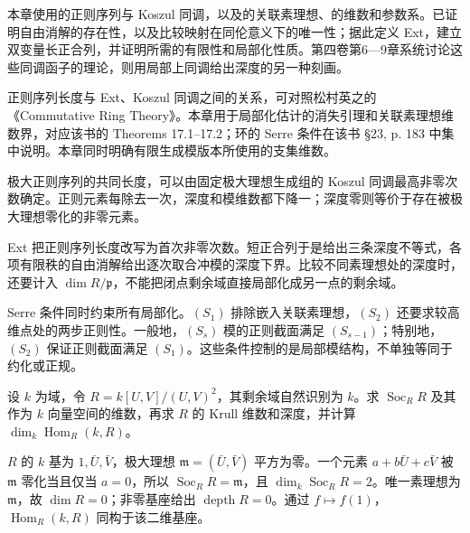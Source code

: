 \ProseParagraphBreak

本章使用的正则序列与 Koszul 同调，以及的关联素理想、的维数和参数系。已证明自由消解的存在性，以及比较映射在同伦意义下的唯一性；据此定义 Ext，建立双变量长正合列，并证明所需的有限性和局部化性质。第四卷第6—9章系统讨论这些同调函子的理论，则用局部上同调给出深度的另一种刻画。

\ProseParagraphBreak
正则序列长度与 Ext、Koszul 同调之间的关系，可对照松村英之的《Commutative Ring Theory》\cite[\S16, Theorems 16.6--16.8, pp. 129--131]{Matsumura1989CommutativeRingTheory}。本章用于局部化估计的消失引理和关联素理想维数界，对应该书的 Theorems 17.1--17.2\cite[pp. 133--134]{Matsumura1989CommutativeRingTheory}；环的 Serre 条件在该书 \S23, p. 183 中集中说明\cite[\S23, p. 183]{Matsumura1989CommutativeRingTheory}。本章同时明确有限生成模版本所使用的支集维数。






\begin{chaptersummary}
	极大正则序列的共同长度，可以由固定极大理想生成组的 Koszul 同调最高非零次数确定。正则元素每除去一次，深度和模维数都下降一；深度零则等价于存在被极大理想零化的非零元素。

	\ProseParagraphBreak
	Ext 把正则序列长度改写为首次非零次数。短正合列于是给出三条深度不等式，各项有限秩的自由消解给出逐次取合冲模的深度下界。比较不同素理想处的深度时，还要计入 \(\dim R/\mathfrak p\)，不能把闭点剩余域直接局部化成另一点的剩余域。

	\ProseParagraphBreak
	Serre 条件同时约束所有局部化。\((S_1)\) 排除嵌入关联素理想，\((S_2)\) 还要求较高维点处的两步正则性。一般地，\((S_s)\) 模的正则截面满足 \((S_{s-1})\)；特别地，\((S_2)\) 保证正则截面满足 \((S_1)\)。这些条件控制的是局部模结构，不单独等同于约化或正规。
\end{chaptersummary}

\BookExercises

\begin{exercise}\label{b3:ex:16-square-zero-socle}
	设 \(k\) 为域，令 \(R=k[U,V]/(U,V)^2\)，其剩余域自然识别为 \(k\)。求 \(\operatorname{Soc}_RR\) 及其作为 \(k\) 向量空间的维数，再求 \(R\) 的 Krull 维数和深度，并计算 \(\dim_k\operatorname{Hom}_R(k,R)\)。
\end{exercise}
\begin{solution}
	\(R\) 的 \(k\) 基为 \(1,\bar U,\bar V\)，极大理想 \(\mathfrak m=(\bar U,\bar V)\) 平方为零。一个元素 \(a+b\bar U+c\bar V\) 被 \(\mathfrak m\) 零化当且仅当 \(a=0\)，所以 \(\operatorname{Soc}_RR=\mathfrak m\)，且 \(\dim_k\operatorname{Soc}_RR=2\)。唯一素理想为 \(\mathfrak m\)，故 \(\dim R=0\)；非零基座给出 \(\operatorname{depth}R=0\)。通过 \(f\mapsto f(1)\)，\(\operatorname{Hom}_R(k,R)\) 同构于该二维基座。
\end{solution}

